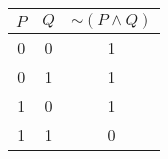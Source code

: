 \begin{tabular}{|c|c||c|}
\hline
$ P $ & $ Q $ & $  \sim (P \wedge Q) $ \\
\hline
0 & 0 & 1 \\
0 & 1 & 1 \\
1 & 0 & 1 \\
1 & 1 & 0 \\
\hline
\end{tabular}
